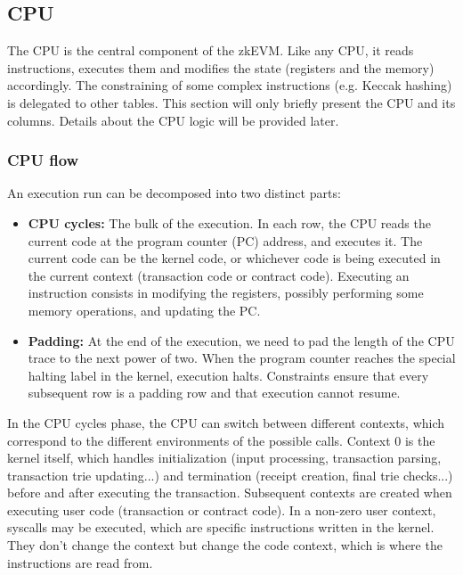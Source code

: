 \subsection{CPU}
\label{cpu}

The CPU is the central component of the zkEVM. Like any CPU, it reads instructions, executes them and modifies the state (registers and the memory)
accordingly. The constraining of some complex instructions (e.g. Keccak hashing) is delegated to other tables.
This section will only briefly present the CPU and its columns. Details about the CPU logic will be provided later.

\subsubsection{CPU flow}

An execution run can be decomposed into two distinct parts:
\begin{itemize}
    \item \textbf{CPU cycles:} The bulk of the execution. In each row, the CPU reads the current code at the program counter (PC) address, and executes it. The current code can be the kernel code,
or whichever code is being executed in the current context (transaction code or contract code). Executing an instruction consists in modifying the registers, possibly
performing some memory operations, and updating the PC.
    \item \textbf{Padding:} At the end of the execution, we need to pad the length of the CPU trace to the next power of two. When the program counter reaches the special halting label
in the kernel, execution halts. Constraints ensure that every subsequent row is a padding row and that execution cannot resume.
\end{itemize}

In the CPU cycles phase, the CPU can switch between different contexts, which correspond to the different environments of the possible calls. Context 0 is the kernel itself, which
handles initialization (input processing, transaction parsing, transaction trie updating...) and termination (receipt creation, final trie checks...) before and after executing the transaction. Subsequent contexts are created when
executing user code (transaction or contract code). In a non-zero user context, syscalls may be executed, which are specific instructions written in the kernel. They don't change the context
but change the code context, which is where the instructions are read from.

